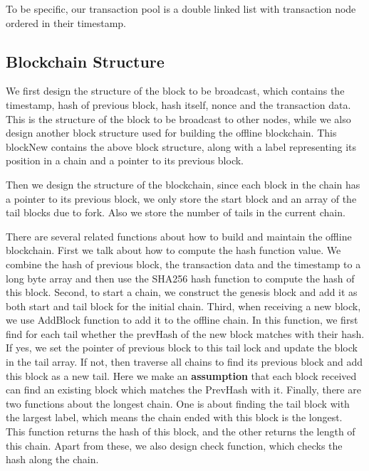 \documentclass{article}
\begin{document}
    To be specific, our transaction pool is a double linked list with transaction node ordered in their timestamp. 
    \subsection{Blockchain Structure}

    We first design the structure of the block to be broadcast, which contains the timestamp, hash of previous block, hash itself, nonce and the transaction data. This is the structure of the block to be broadcast to other nodes, while we also design another block structure used for building the offline blockchain. This blockNew contains the above block structure, along with a label representing its position in a chain and a pointer to its previous block.

    Then we design the structure of the blockchain, since each block in the chain has a pointer to its previous block, we only store the start block and an array of the tail blocks due to fork. Also we store the number of tails in the current chain.

    There are several related functions about how to build and maintain the offline blockchain. First we talk about how to compute the hash function value. We combine the hash of previous block, the transaction data and the timestamp to a long byte array and then use the SHA256 hash function to compute the hash of this block. Second, to start a chain, we construct the genesis block and add it as both start and tail block for the initial chain. Third, when receiving a new block, we use AddBlock function to add it to the offline chain. In this function, we first find for each tail whether the prevHash of the new block matches with their hash. If yes, we set the pointer of previous block to this tail lock and update the block in the tail array. If not, then traverse all chains to find its previous block and add this block as a new tail. Here we make an \textbf{assumption} that each block received can find an existing block which matches the PrevHash with it. Finally, there are two functions about the longest chain. One is about finding the tail block with the largest label, which means the chain ended with this block is the longest. This function returns the hash of this block, and the other returns the length of this chain. Apart from these, we also design check function, which checks the hash along the chain.
\end{document}
